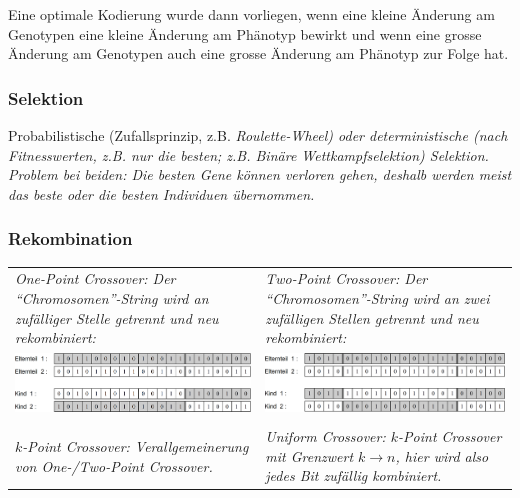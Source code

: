   	Eine optimale Kodierung wurde dann vorliegen, wenn eine kleine Änderung am Genotypen eine kleine Änderung am Phänotyp bewirkt und wenn eine grosse Änderung am Genotypen auch eine grosse Änderung am Phänotyp zur Folge hat.

\subsubsection{Selektion }
  Probabilistische (Zufallsprinzip, z.B. \em Roulette-Wheel\em ) oder deterministische (nach Fitnesswerten, z.B. nur die besten; z.B. \em Binäre Wettkampfselektion\em ) Selektion. Problem bei beiden: Die besten Gene können verloren gehen, deshalb werden meist das beste oder die besten Individuen übernommen.
  
\subsubsection{Rekombination }
  \begin{tabularx}{\textwidth}{p{9cm} p{9cm}}
    \em One-Point Crossover\em : Der "`Chromosomen"'-String wird an zufälliger Stelle getrennt und neu rekombiniert: 
      & \em Two-Point Crossover\em : Der "`Chromosomen"'-String wird an zwei zufälligen Stellen getrennt und neu rekombiniert: \\
    \includegraphics[width=8cm]{./Content/MetaHeuristics/GeneticAlgorithms_OnePointCrossover}
      & \includegraphics[width=8cm]{./Content/MetaHeuristics/GeneticAlgorithms_TwoPointCrossover} \\ \\
    \em $k$-Point Crossover\em : Verallgemeinerung von One-/Two-Point Crossover.
      & \em Uniform Crossover\em : $k$-Point Crossover mit Grenzwert $k \rightarrow n$, hier wird also jedes Bit zufällig kombiniert.
  \end{tabularx}
   
  
